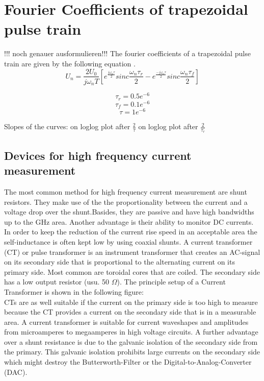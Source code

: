 \section{Fourier Coefficients of trapezoidal pulse  train }
!!! noch genauer ausformulieren!!!
The fourier coefficients of a trapezoidal pulse train are given by the following equation \cite{}. 
\begin{equation}
 U_n = \frac{2 U_0}{j \omega_n T} [e^{\frac{j \omega_n \tau}{2}} sinc{\frac { \omega_n \tau_r }{2}} -e^{\frac{-j \omega_n \tau}{2}} sinc{\frac{ \omega_n \tau_f}{2}}]
\end{equation}

 
\begin{equation}
 \tau_r = 0.5e^{-6 }
  \end{equation}
  \begin{equation}
 \tau_f = 0.1e^{-6}
  \end{equation}
 \begin{equation}
\tau= 1e^{-6}
 \end{equation}
 
Slopes of the curves:  on loglog plot after $\frac{2}{\tau}$  on loglog plot after $\frac{2}{\tau_r}$



	
\subsection{Devices for high frequency current measurement}
The most common method for high frequency current measurement are shunt resistors. They make use of the the proportionality between the current and a voltage drop over the shunt.Basides, they are passive and have high bandwidths up to the GHz area. Another advantage is their ability to monitor DC currents. In order to keep the reduction of the current rise speed in an acceptable area the self-inductance is often kept low by using coaxial shunts. \cite{highdynamiccurrent}
A current transformer (CT) or pulse transformer is an instrument transformer that creates an AC-signal on its secondary side that is proportional to the alternating current on its primary side. Most common are toroidal cores that are coiled. The secondary side has a low output resistor (usu. 50 $\Omega$).
The principle setup of a Current Transformer is shown in the following figure: 
\\CTs are as well suitable if the current on the primary side is too high to measure because the CT provides a current on the secondary side that is in a measurable area. A current transformer is suitable for current waveshapes and amplitudes from microamperes to megaamperes in high voltage circuits. A further advantage over a shunt resistance is due to the galvanic isolation of the secondary side from the primary. This galvanic isolation prohibits large currents on the secondary side which might destroy the Butterworth-Filter or the Digital-to-Analog-Converter (DAC). 

